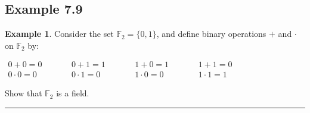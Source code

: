 \documentclass[openany, amssymb, psamsfonts]{amsart}
\newcommand{\bbF}{\mathbb{F}}
\theoremstyle{definition}
\newtheorem{exmp}{Example}[section]
\numberwithin{equation}{section}
\begin{document}
\subsection*{Example 7.9}
\label{7.9}
\begin{exmp}
	Consider the set $\bbF_{2} = \{0, 1\}$, and define binary operations $+$ and $\cdot$ on $\bbF_{2}$ by:
	\begin{center}
	$
	\begin{array}{ccccccc}
		0 + 0 = 0 & \phantom{MM} & 0 + 1 = 1 & \phantom{MM} & 1 + 0 = 1 & \phantom{MM} &1 + 1 = 0 \\
		0 \cdot 0 = 0 & \phantom{MM} & 0 \cdot 1 = 0 & \phantom{MM}  & 1\cdot 0 =0 & \phantom{MM} &1 \cdot 1 = 1 
	\end{array}
	$
	\end{center}
	
	Show that $\bbF_{2}$ is a field.  
\end{exmp}
\vspace{4pt}     \hrule   \vspace{4pt}
\end{document}
